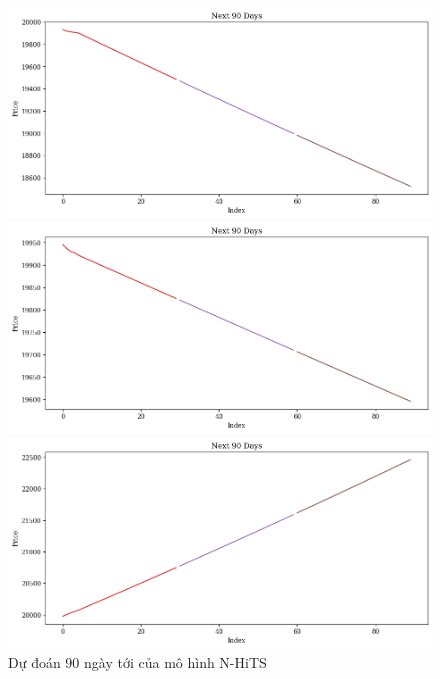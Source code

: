 \begin{figure}[H]
\begin{minipage}{0.15\textwidth}
    \end{minipage}
    \hfill
    \begin{minipage}{0.15\textwidth}
    \centering
    \includegraphics[width=1\textwidth]{resources/chapter-5/newdata1/predicted/EIB_N-HiTS_7-3_90Days.png}
    \end{minipage}
    \hfill
    \begin{minipage}{0.15\textwidth}
    \centering
    \includegraphics[width=1\textwidth]{resources/chapter-5/newdata1/predicted/EIB_N-HiTS_8-2_90Days.png}
    \end{minipage}
    \hfill
        \begin{minipage}{0.15\textwidth}
    \centering
    \includegraphics[width=1\textwidth]{resources/chapter-5/newdata1/predicted/EIB_N-HiTS_9-1_90Days.png}
    \end{minipage}
    \hfill
    
    \caption{Dự đoán 90 ngày tới của mô hình N-HiTS}
    \label{fig:n-hits_predicted}
\end{figure}